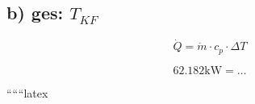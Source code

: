\subsection*{b) ges: $T_{KF}$}

\[
\dot{Q} = \dot{m} \cdot c_p \cdot \Delta T
\]

\[
62.182 \text{kW} = \ldots
\]

``````latex